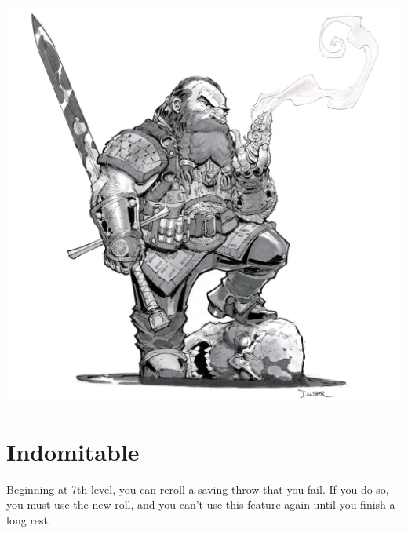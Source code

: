 \begin{multicols*}{2}
\begin{Figure}
\centering
\includegraphics[width=\textwidth]{img/fighter-dwarf.png}
\end{Figure}
    

\section*{Indomitable}

Beginning at 7th level, you can reroll a saving throw that you fail. If you do so, you must use the new roll, and you can’t use this feature again until you finish a long rest.




\end{multicols*}

\clearpage





